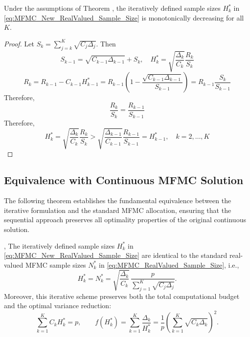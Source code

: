 %
\begin{theorem}\label{thm:Monotonicity_H_k}
Under the assumptions of Theorem \label{thm:Sample_size_est}, the iteratively defined sample sizes $H_k^*$ in \eqref{eq:MFMC_New_RealValued_Sample_Size} is monotonically decreasing for all $K$.
\end{theorem}
%
\begin{proof}
Let $S_k = \sum_{j=k}^K \sqrt{C_j\Delta_j}$. Then
\[
S_{k-1} = \sqrt{C_{k-1}\Delta_{k-1}}+S_k, \quad H_k^* = \sqrt{\frac{\Delta_k}{C_k}}\frac{R_k}{S_k}
\]
\[
R_k = R_{k-1}-C_{k-1}H_{k-1}^* = R_{k-1}\left(1-\frac{\sqrt{C_{k-1}\Delta_{k-1}}}{S_{k-1}}\right) = R_{k-1}\frac{S_k}{S_{k-1}}
\]
Therefore, 
\[
\frac{R_k}{S_k} = \frac{R_{k-1}}{S_{k-1}}
\]
Therefore,
\[
H_k^* = \sqrt{\frac{\Delta_k}{C_k}}\frac{R_k}{S_k}>\sqrt{\frac{\Delta_{k-1}}{C_{k-1}}}\frac{R_{k-1}}{S_{k-1}} = H_{k-1}^*, \quad k=2,\ldots,K
\]

\end{proof}


\subsection{Equivalence with Continuous MFMC Solution}

The following theorem establishes the fundamental equivalence between the iterative formulation and the standard MFMC allocation, ensuring that the sequential approach preserves all optimality properties of the original continuous solution.

%
\begin{theorem}\label{thm:MFMC_Iterative_RealValued_Sample_Size}
,
The iteratively defined sample sizes $H_k^*$ in \eqref{eq:MFMC_New_RealValued_Sample_Size} are identical to the standard real-valued MFMC sample sizes $N_k^*$ in \eqref{eq:MFMC_RealValued_Sample_Size}, i.e.,
\[
H_k^* = N_k^*
    = \sqrt{\frac{\Delta_k}{C_k}}\,
      \frac{p}{\sum_{j=1}^K \sqrt{C_j\Delta_j}}.
\]
Moreover, this iterative scheme preserves both the total computational budget and the optimal variance reduction:
\[
\sum_{k=1}^K C_k H_k^* = p, 
\qquad  
f(H_k^*) = \sum_{k=1}^K \frac{\Delta_k}{H_k^*} = \frac{1}{p} \left(\sum_{k=1}^K \sqrt{C_k\Delta_k}\right)^2.
\]
\end{theorem}
%


